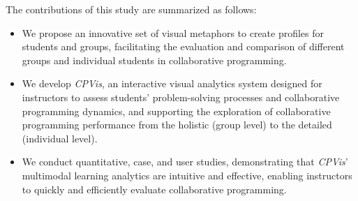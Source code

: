 The contributions of this study are summarized as follows:  

\begin{itemize}
	\item We propose an innovative set of visual metaphors to create profiles for students and groups, facilitating the evaluation and comparison of different groups and individual students in collaborative programming.


	\item We develop \textit{CPVis}, an interactive visual analytics system designed for instructors to assess students' problem-solving processes and collaborative programming dynamics, and supporting the exploration of collaborative programming performance from the holistic (group level) to the detailed (individual level).
    
    
	\item We conduct quantitative, case, and user studies, demonstrating that \textit{CPVis}' multimodal learning analytics are intuitive and effective, enabling instructors to quickly and efficiently evaluate collaborative programming. 


 
\end{itemize}














